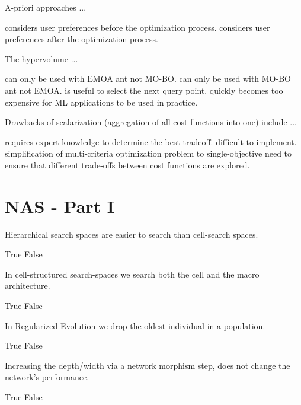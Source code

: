 \documentclass{exam}
\begin{document}
\begin{questions}
\question A-priori approaches ...
\begin{choices}
    \choice considers user preferences before the optimization process. %
    \choice considers user preferences after the optimization process.
\end{choices}

\question The hypervolume ...
\begin{choices}
    \choice can only be used with EMOA ant not MO-BO.
    \choice can only be used with MO-BO ant not EMOA.
    \choice is useful to select the next query point. %
    \choice quickly becomes too expensive for ML applications to be used in practice.
\end{choices}

\question Drawbacks of scalarization (aggregation of all cost functions into one) include ...
\begin{choices}
    \choice requires expert knowledge to determine the best tradeoff. %
    \choice difficult to implement.
    \choice simplification of multi-criteria optimization problem to single-objective
    \choice need to ensure that different trade-offs
between cost functions are explored. %
\end{choices}	

\section{NAS - Part I}
\question Hierarchical search spaces are easier to search than cell-search spaces.
\begin{choices}
    \choice True
    \choice False %
\end{choices}

\question In cell-structured search-spaces we search both the cell and the macro architecture.
\begin{choices}
    \choice True
    \choice False %
\end{choices}

\question In Regularized Evolution we drop the oldest individual in a population.
\begin{choices}
    \choice True  %
    \choice False
\end{choices}

\question Increasing the depth/width via a network morphism step, does not change the network’s performance.
\begin{choices}
    \choice True %
    \choice False
\end{choices}


\end{questions}
\end{document}
